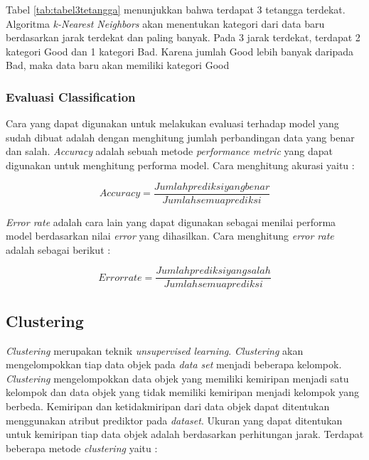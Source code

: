 Tabel \ref{tab:tabel3tetangga} menunjukkan bahwa terdapat 3 tetangga terdekat. Algoritma \textit{k-Nearest Neighbors} akan menentukan kategori dari data baru berdasarkan jarak terdekat dan paling banyak. Pada 3 jarak terdekat, terdapat 2 kategori Good dan 1 kategori Bad. Karena jumlah Good lebih banyak daripada Bad, maka data baru akan memiliki kategori Good

 
\subsubsection{Evaluasi Classification} 
Cara yang dapat digunakan untuk melakukan evaluasi terhadap model yang sudah dibuat adalah dengan menghitung jumlah perbandingan data yang benar dan salah. \textit{Accuracy} adalah sebuah metode \textit{performance metric} yang dapat digunakan untuk menghitung performa model. Cara menghitung akurasi yaitu : 

\begin{displaymath}
    Accuracy  = \frac{Jumlah prediksi yang benar}{Jumlah semua prediksi}
\end{displaymath} 

\textit{Error rate} adalah cara lain yang dapat digunakan sebagai menilai performa model berdasarkan nilai \textit{error} yang dihasilkan. Cara menghitung \textit{error rate} adalah sebagai berikut : 

\begin{displaymath}
 Error rate = \frac{Jumlah prediksi yang salah}{Jumlah semua prediksi}
\end{displaymath}

\subsection{Clustering}
\textit{Clustering} merupakan teknik \textit{unsupervised learning}. \textit{Clustering} akan mengelompokkan tiap data objek pada \textit{data set} menjadi beberapa kelompok. \textit{Clustering} mengelompokkan data objek yang memiliki kemiripan menjadi satu kelompok dan data objek yang tidak memiliki kemiripan menjadi kelompok yang berbeda. Kemiripan dan ketidakmiripan dari data objek dapat ditentukan menggunakan atribut prediktor pada \textit{dataset}. Ukuran yang dapat ditentukan untuk kemiripan tiap data objek adalah berdasarkan perhitungan jarak. Terdapat beberapa metode \textit{clustering} yaitu : 

